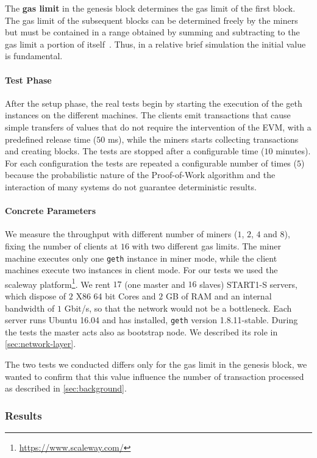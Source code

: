 The \textbf{gas limit} in the genesis block determines the gas limit of the
first block. The gas limit of the subsequent blocks can be determined freely by
the miners but must be contained in a range obtained by summing and subtracting
to the gas limit a portion of itself~\cite{wood2018ethereum}. Thus, in a
relative brief simulation the initial value is fundamental.

\paragraph{Test Phase}
After the setup phase, the real tests begin by starting the execution of the
geth instances on the different machines. The clients emit transactions that
cause simple transfers of values that do not require the intervention of the
EVM, with a predefined release time ($50$ ms), while the miners starts
collecting transactions and creating blocks. The tests are stopped after a
configurable time ($10$ minutes). For each configuration the tests are repeated
a configurable number of times ($5$) because the probabilistic nature of the
Proof-of-Work algorithm and the interaction of many systems do not guarantee
deterministic results.


\paragraph{Concrete Parameters}
We measure the throughput with different number of miners ($1$, $2$, $4$ and
$8$), fixing the number of clients at $16$ with two different gas limits.
The miner machine executes only one \texttt{geth} instance in miner mode, while
the client machines execute two instances in client mode. For our tests we used
the scaleway
platform\footnote{\url{https://www.scaleway.com/}}. We rent $17$ (one master
and $16$ slaves) START1-S servers, which dispose of $2$ X86 64 bit Cores and
$2$ GB of RAM and an internal bandwidth of $1$ Gbit/s, so that the network
would not be a bottleneck. Each server runs Ubuntu 16.04 and has installed,
\texttt{geth} version 1.8.11-stable. During the tests the master acts also as
bootstrap node. We described its role in \autoref{sec:network-layer}.

The two tests we conducted differs only for the gas limit in the genesis block,
we wanted to confirm that this value influence the number of transaction
processed as described in \autoref{sec:background}.


\subsubsection{Results}


